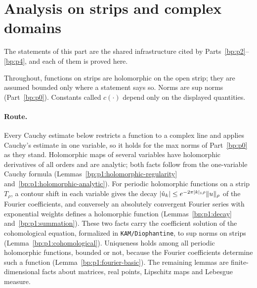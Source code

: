 \section{Analysis on strips and complex domains}\label{bp:p1}

The statements of this part are the shared infrastructure cited by Parts~\ref{bp:p2}--\ref{bp:p4},
and each of them is proved here.

Throughout, functions on strips are holomorphic on the open strip; they are assumed bounded only where a
statement says so. Norms are sup norms (Part~\ref{bp:p0}). Constants called $c(\cdot)$ depend only on the displayed quantities.

\paragraph{Route.} Every Cauchy estimate below restricts a function to a complex line and applies
Cauchy's estimate in one variable, so it holds for the max norms of Part~\ref{bp:p0} as they stand.
Holomorphic maps of several variables have holomorphic derivatives of all orders and are analytic;
both facts follow from the one-variable Cauchy formula
(Lemmas~\ref{bp:p1:holomorphic-regularity} and~\ref{bp:p1:holomorphic-analytic}). For periodic
holomorphic functions on a strip $T_\rho$, a contour shift in each variable gives the decay
$\lvert \hat u_k\rvert\le e^{-2\pi\lvert k\rvert_1\rho}\lVert u\rVert_\rho$ of the Fourier coefficients, and conversely an
absolutely convergent Fourier series with exponential weights defines a holomorphic function
(Lemmas~\ref{bp:p1:decay} and~\ref{bp:p1:summation}). These two facts carry the coefficient solution
of the cohomological equation, formalized in \texttt{KAM/Diophantine}, to sup norms on strips
(Lemma~\ref{bp:p1:cohomological}). Uniqueness holds among all periodic holomorphic functions, bounded
or not, because the Fourier coefficients determine such a function (Lemma~\ref{bp:p1:fourier-basic}).
The remaining lemmas are finite-dimensional facts about matrices, real points, Lipschitz maps and
Lebesgue measure.

